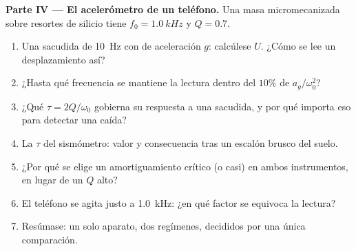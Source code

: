 \begin{problem}
\medskip
\noindent\textbf{Parte IV --- El acelerómetro de un teléfono.}
Una masa micromecanizada sobre resortes de silicio tiene
$f_0 = \qty{1.0}{kHz}$ y $Q = 0.7$.
\begin{enumerate}[resume]
  \item Una sacudida de \qty{10}{Hz} con  de aceleración $g$:
        calcúlese $U$. ¿Cómo se lee un desplazamiento así?
  \item ¿Hasta qué frecuencia se mantiene la lectura dentro del $10\%$ de
        $a_g/\omega_0^2$?
  \item ¿Qué  $\tau = 2Q/\omega_0$ gobierna su respuesta
        a una sacudida, y por qué importa eso para detectar una caída?
  \item La $\tau$ del sismómetro: valor y consecuencia tras un escalón
        brusco del suelo.
  \item ¿Por qué se elige un amortiguamiento crítico (o casi) en ambos
        instrumentos, en lugar de un $Q$ alto?
  \item El teléfono se agita justo a \qty{1.0}{kHz}: ¿en qué factor se
        equivoca la lectura?
  \item Resúmase: un solo aparato, dos regímenes, decididos por una única
        comparación.
\end{enumerate}
\end{problem}

